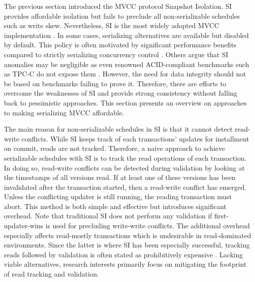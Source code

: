 
The previous section introduced the MVCC protocol Snapshot Isolation. SI
provides affordable isolation but fails to preclude all non-serializable
schedules such as write skew. Nevertheless, SI is the most widely adopted MVCC
implementation \cite{larson2011high, neumann2015fast}. In some cases,
serializing alternatives are available but disabled by default. This policy is
often motivated by significant performance benefits compared to strictly
serializing concurrency control \cite{cahill2009serializable}. Others argue that
SI anomalies may be negligible as even renowned ACID-compliant benchmarks such
as TPC-C do not expose them \cite{fekete2005making}. However, the need for data
integrity should not be based on benchmarks failing to prove it. Therefore,
there are efforts to overcome the weaknesses of SI and provide strong
consistency without falling back to pessimistic approaches. This section
presents an overview on approaches to making serializing MVCC affordable.

The main reason for non-serializable schedules in SI is that it cannot detect
read-write conflicts. While SI keeps track of each transactions' updates for
installment on commit, reads are not tracked. Therefore, a naive approach to
achieve serializable schedules with SI is to track the read operations of each
transaction. In doing so, read-write conflicts can be detected during validation
by looking at the timestamps of all versions read. If at least one of these
versions has been invalidated after the transaction started, then a read-write
conflict has emerged. Unless the conflicting updater is still running, the
reading transaction must abort. This method is both simple and effective but
introduces significant overhead. Note that traditional SI does not perform any
validation if first-updater-wins is used for precluding write-write conflicts.
The additional overhead especially affects read-mostly transactions which is
undesirable in read-dominated environments. Since the latter is where SI has
been especially successful, tracking reads followed by validation is often
stated as prohibitively expensive \cite{cahill2009serializable}. Lacking viable
alternatives, research interests primarily focus on mitigating the footprint of
read tracking and validation.

